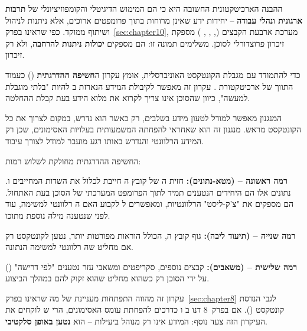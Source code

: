 ההבנה הארכיטקטונית החשובה היא כי  הם המימוש הדיגיטלי והקומפוזיציונלי של \textbf{תרבות ארגונית ונהלי עבודה} – יחידות ידע שאינן מרוחות בתוך פרומפטים ארוכים, אלא ניתנות לניהול ושיתוף ממוקד. כפי שראינו בפרק~\ref{sec:chapter10}, מערכת ארבעת הקבצים (, , , ) מספקת זיכרון פרוצדורלי לסוכן.  משלימים תמונה זו: הם מספקים \textbf{יכולות ניתנות להרחבה}, ולא רק זיכרון.


כדי להתמודד עם מגבלת הקונטקסט האוניברסלית, אומץ עקרון ה\textbf{חשיפה ההדרגתית} () כעמוד התווך של ארכיטקטורת \cite{anthropic2025progressive}. עקרון זה מאפשר לקיבולת המידע הנארזת ב להיות "בלתי מוגבלת למעשה", כיוון שהסוכן אינו צריך לקרוא את מלוא הידע בעת קבלת ההחלטה.

המנגנון מאפשר למודל לטעון מידע בשלבים, רק כאשר הוא נדרש, במקום לצרוך את כל הקונטקסט מראש. מנגנון זה הוא שאחראי להפחתה המשמעותית בעלויות האסימונים, שכן רק המידע הרלוונטי והנדרש באותו רגע מועבר למודל לצורך עיבוד.

החשיפה ההדרגתית מחולקת לשלוש רמות:

\textbf{רמה ראשונה –  (מטא-נתונים):} חזית ה של קובץ ה חייבת לכלול את השדות המחייבים  ו\cite{anthropic2025skillsbest}. נתונים אלו הם היחידים הנטענים תמיד לתוך הפרומפט המערכתי של הסוכן בעת האתחול. הם מספקים את "צ'ק-ליסט" הרלוונטיות, ומאפשרים ל לקבוע האם ה רלוונטי למשימה, עוד לפני שנטענה מילה נוספת מתוכו.

\textbf{רמה שנייה –  (תיעוד ליבה):} גוף קובץ ה, הכולל הוראות מפורטות יותר, נטען לקונטקסט רק אם  מחליט שה רלוונטי למשימה הנתונה.

\textbf{רמה שלישית –  (משאבים):} קבצים נוספים, סקריפטים ומשאבי עזר נטענים "לפי דרישה" () על ידי הסוכן רק כשהוא מחליט שהוא זקוק להם במהלך הביצוע.

עקרון זה מהווה התפתחות מעניינת של מה שראינו בפרק~\ref{sec:chapter8} לגבי הנדסת קונטקסט (). אם בפרק~\num{8} דנו ב ו כדרכים להפחתת עומס האסימונים, הרי ש לוקחים את העיקרון הזה צעד נוסף: המידע אינו רק מנוהל ביעילות – הוא \textbf{נטען באופן סלקטיבי}.



